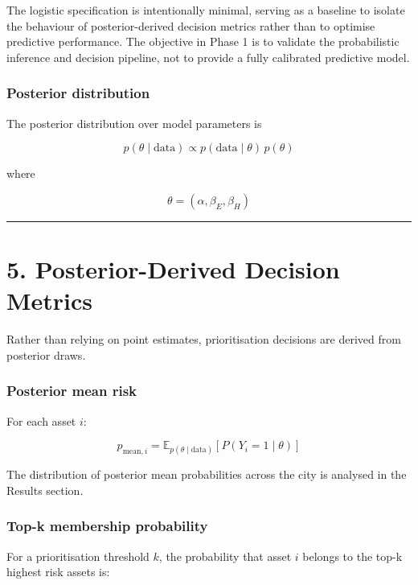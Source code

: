 \documentclass[
]{article}
\begin{document}
The logistic specification is intentionally minimal, serving as a
baseline to isolate the behaviour of posterior-derived decision metrics
rather than to optimise predictive performance. The objective in Phase 1
is to validate the probabilistic inference and decision pipeline, not to
provide a fully calibrated predictive model.

\subsubsection{Posterior distribution}\label{posterior-distribution}

The posterior distribution over model parameters is

\[
p(\theta \mid \text{data})
\propto
p(\text{data} \mid \theta)\,p(\theta)
\]

where

\[
\theta = (\alpha, \beta_E, \beta_H)
\]

\begin{center}\rule{0.5\linewidth}{0.5pt}\end{center}

\section{5. Posterior-Derived Decision
Metrics}\label{posterior-derived-decision-metrics}

Rather than relying on point estimates, prioritisation decisions are
derived from posterior draws.

\subsubsection{Posterior mean risk}\label{posterior-mean-risk}

For each asset \(i\):

\[
p_{\text{mean}, i}
=
\mathbb{E}_{p(\theta \mid \text{data})}
\left[
P(Y_i = 1 \mid \theta)
\right]
\]

The distribution of posterior mean probabilities across the city is
analysed in the Results section.

\subsubsection{Top-k membership
probability}\label{top-k-membership-probability}

For a prioritisation threshold \(k\), the probability that asset \(i\)
belongs to the top-k highest risk assets is:
\end{document}
